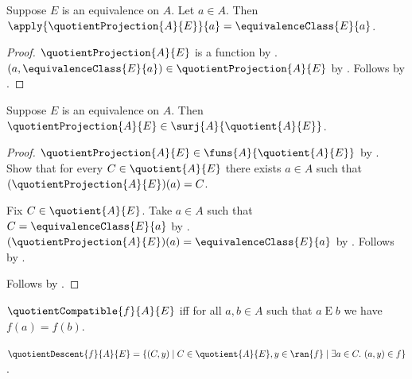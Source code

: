 \begin{proposition}\label{quotient_projection_apply}
    Suppose $E$ is an equivalence on $A$.
    Let $a\in A$.
    Then $\apply{\quotientProjection{A}{E}}{a}=
        \equivalenceClass{E}{a}$.
\end{proposition}
\begin{proof}
    $\quotientProjection{A}{E}$ is a function by
        .
    $(a,\equivalenceClass{E}{a})\in\quotientProjection{A}{E}$ by
        .
    Follows by .
\end{proof}

\begin{theorem}\label{quotient_projection_surjective}
    Suppose $E$ is an equivalence on $A$.
    Then $\quotientProjection{A}{E}\in
        \surj{A}{\quotient{A}{E}}$.
\end{theorem}
\begin{proof}
    $\quotientProjection{A}{E}\in
        \funs{A}{\quotient{A}{E}}$ by
        .
    Show that for every $C\in\quotient{A}{E}$ there exists $a\in A$
        such that $(\quotientProjection{A}{E})(a)=C$.
    \begin{subproof}
        Fix $C\in\quotient{A}{E}$.
        Take $a\in A$ such that $C=\equivalenceClass{E}{a}$ by
            .
        $(\quotientProjection{A}{E})(a)
            =\equivalenceClass{E}{a}$ by
            .
        Follows by \auto.
    \end{subproof}
    Follows by .
\end{proof}

\begin{definition}\label{quotient_compatible}
    $\quotientCompatible{f}{A}{E}$ iff
        for all $a,b\in A$ such that $a\mathrel{E}b$ we have
            $f(a)=f(b)$.
\end{definition}

\begin{definition}\label{quotient_descent}
    $\quotientDescent{f}{A}{E}=
        \{(C,y)\mid C\in\quotient{A}{E},y\in\ran{f}\mid
            \exists a\in C.\ (a,y)\in f\}$.
\end{definition}

